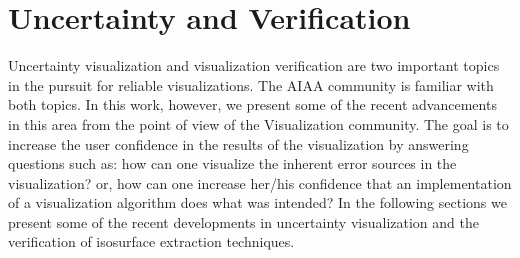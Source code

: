 

\section{Uncertainty and Verification}
\label{sec:verif}

Uncertainty visualization  and  visualization verification  are two important topics in the pursuit for reliable visualizations. 
The AIAA community is  familiar with both topics. In this work, however, we present some of the recent advancements in this area from the point of view of the Visualization community. The goal is to increase the user confidence in the results of the visualization by answering questions such as: how can one visualize the inherent error sources in the visualization? or, how can one increase her/his confidence that an implementation of a visualization algorithm  does what was intended? In the following sections we present some of the recent developments in uncertainty visualization and the verification of isosurface extraction techniques.


